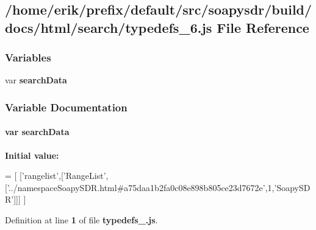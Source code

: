\subsection{/home/erik/prefix/default/src/soapysdr/build/docs/html/search/typedefs\+\_\+6.js File Reference}
\label{typedefs__6_8js}
\subsubsection*{Variables}
\begin{DoxyCompactItemize}
\item 
var {\bf search\+Data}
\end{DoxyCompactItemize}


\subsubsection{Variable Documentation}
\paragraph[{search\+Data}]{\setlength{\rightskip}{0pt plus 5cm}var search\+Data}\label{typedefs__6_8js_ad01a7523f103d6242ef9b0451861231e}
{\bfseries Initial value\+:}
\begin{DoxyCode}
=
[
  [\textcolor{stringliteral}{'rangelist'},[\textcolor{stringliteral}{'RangeList'},[\textcolor{stringliteral}{'../namespaceSoapySDR.html#a75daa1b2fa0c08e898b805ce23d7672e'},1,\textcolor{stringliteral}{'SoapySDR'}]]]
]
\end{DoxyCode}


Definition at line {\bf 1} of file {\bf typedefs\+\_.\+js}.

